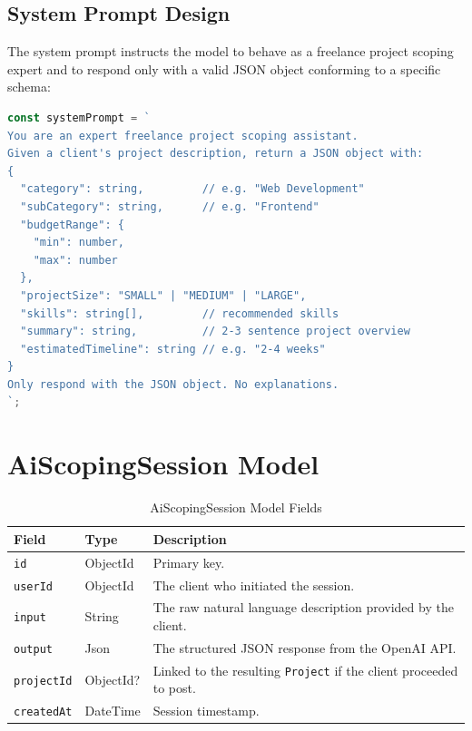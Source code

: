 \subsection{System Prompt Design}

The system prompt instructs the model to behave as a freelance project scoping expert and to respond only with a valid JSON object conforming to a specific schema:

\begin{lstlisting}[language=TypeScript, caption={AI System Prompt Structure}]
const systemPrompt = `
You are an expert freelance project scoping assistant.
Given a client's project description, return a JSON object with:
{
  "category": string,         // e.g. "Web Development"
  "subCategory": string,      // e.g. "Frontend"
  "budgetRange": {
    "min": number,
    "max": number
  },
  "projectSize": "SMALL" | "MEDIUM" | "LARGE",
  "skills": string[],         // recommended skills
  "summary": string,          // 2-3 sentence project overview
  "estimatedTimeline": string // e.g. "2-4 weeks"
}
Only respond with the JSON object. No explanations.
`;
\end{lstlisting}

\section{AiScopingSession Model}

\begin{table}[H]
\centering
\caption{AiScopingSession Model Fields}
\begin{tabularx}{\textwidth}{llX}
\toprule
\textbf{Field} & \textbf{Type} & \textbf{Description} \\
\midrule
\texttt{id}        & ObjectId & Primary key. \\
\texttt{userId}    & ObjectId & The client who initiated the session. \\
\texttt{input}     & String   & The raw natural language description provided by the client. \\
\texttt{output}    & Json     & The structured JSON response from the OpenAI API. \\
\texttt{projectId} & ObjectId? & Linked to the resulting \texttt{Project} if the client proceeded to post. \\
\texttt{createdAt} & DateTime & Session timestamp. \\
\bottomrule
\end{tabularx}
\end{table}

